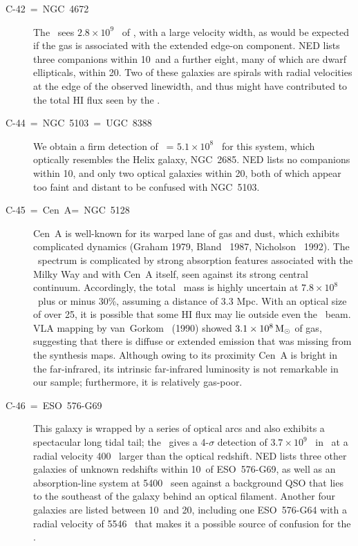 \begin{description}
\item[C-42~=~NGC~4672] 
The \ sees $2.8 \times 10^9$ \MSUN\ of 
\HI, with a large velocity width, 
as would be expected if the gas is associated with the extended edge-on 
component.  
NED lists three companions within 10\AMIN\ and a further eight, 
many of which are dwarf ellipticals, within 20\AMIN.  
Two of these galaxies are spirals with radial velocities at the edge of
the observed linewidth, and thus might have contributed to the total HI
flux seen by the . 

\item[C-44~=~NGC~5103~=~UGC~8388] 
We obtain a firm detection of \MHI\ = \hbox{$5.1 \times 10^8$ \MSUN}  
for this system, which optically resembles the Helix galaxy, NGC~2685. 
NED lists no companions within 10\AMIN, and only two optical galaxies
within 20\AMIN, both of which appear too faint and distant to be confused
with NGC~5103. 

\item[C-45~=~Cen~A=~NGC~5128~] 
Cen~A is well-known for its warped lane of gas and dust, which exhibits 
complicated dynamics (Graham 1979, Bland \etal\ 1987, Nicholson \etal\ 
1992).  The \HI\ spectrum is complicated by strong absorption features 
associated with the Milky Way and with Cen~A itself, seen against its strong 
central continuum.  Accordingly, the total \HI\ mass is highly uncertain at 
$7.8\times 10^8$ \MSUN\ plus or minus 30\%, assuming a distance of 3.3 Mpc.  
With an optical size of over 25\AMIN, it is possible that some HI 
flux may lie outside even the \GB140\ beam.
VLA mapping by van~Gorkom \etal\ (1990) showed $3.1 \times 10^8 {\,{\rm M}_\odot}$ 
of gas, suggesting that there is diffuse or extended emission that was 
missing from the synthesis maps.  
Although owing to its proximity Cen~A is bright in the far-infrared, its 
intrinsic far-infrared luminosity is not remarkable in our sample; furthermore, 
it is relatively gas-poor.

\item[C-46~=~ESO~576-G69] 
This galaxy is wrapped by a series of optical arcs and also exhibits a  
spectacular long tidal tail; the \GB140\ gives 
a 4-$\sigma$ detection  
of $3.7 \times 10^9$ \MSUN\ in \HI\ at a radial velocity 400 \KMS\ larger 
than the optical redshift.    
NED lists three other galaxies of unknown redshifts within 10\AMIN\ of 
ESO~576-G69, as well as an absorption-line system at 5400 \KMS\ seen against 
a background QSO that lies to the southeast of the galaxy behind an optical 
filament. 
Another four galaxies are listed between 10\AMIN\ and 20\AMIN, including 
one ESO~576-G64 with a radial velocity of 5546 \KMS\ that makes it a 
possible source of confusion for the \GB140. 


\end{description}
